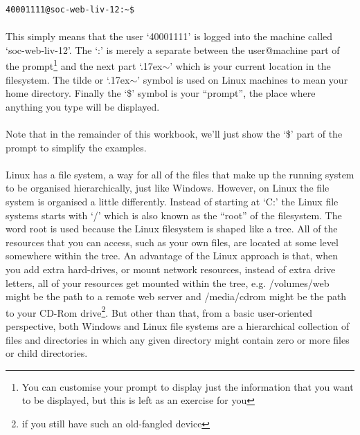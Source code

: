 \documentclass[12pt, a4paper, oneside]{book}
\begin{document}
\begin{lstlisting}[style=DOS]
    40001111@soc-web-liv-12:~$ 
\end{lstlisting}

\paragraph{} This simply means that the user `40001111' is logged into the machine called `soc-web-liv-12'. The `:' is merely a separate between the user@machine part of the prompt\footnote{You can customise your prompt to display just the information that you want to be displayed, but this is left as an exercise for you} and the next part `{\raise.17ex\hbox{$\scriptstyle\sim$}}' which is your current location in the filesystem. The tilde or `{\raise.17ex\hbox{$\scriptstyle\sim$}}' symbol is used on Linux machines to mean your home directory. Finally the `\$' symbol is your ``prompt'', the place where anything you type will be displayed.

\paragraph{} Note that in the remainder of this workbook, we'll just show the `\$' part of the prompt to simplify the examples.

\paragraph{} Linux has a file system, a way for all of the files that make up the running system to be organised hierarchically, just like Windows. However, on Linux the file system is organised a little differently. Instead of starting at `C:' the Linux file systems starts with `/' which is also known as the ``root'' of the filesystem. The word root is used because the Linux filesystem is shaped like a tree. All of the resources that you can access, such as your own files, are located at some level somewhere within the tree. An advantage of the Linux approach is that, when you add extra hard-drives, or mount network resources, instead of extra drive letters, all of your resources get mounted within the tree, e.g. /volumes/web might be the path to a remote web server and /media/cdrom might be the path to your CD-Rom drive\footnote{if you still have such an old-fangled device}. But other than that, from a basic user-oriented perspective, both Windows and Linux file systems are a hierarchical collection of files and directories in which any given directory might contain zero or more files or child directories.
\end{document}
